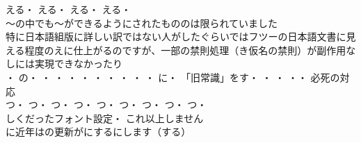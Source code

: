 える・
える・
える・
える・
\\
〜の中でも〜ができるようにされたもののは限られていました\\
特に日本語組版に詳しい訳ではない人がしたぐらいではフツーの日本語文書に見える程度のえに仕上がるのですが、一部の禁則処理（き仮名の禁則）が副作用なしには実現できなかったり\\

・
の・
・
・
・
・
・
・
・
・
・
に・
「旧常識」をす・
・
・
・・
必死の対応\\
つ・
つ・
つ・
つ・
つ・
つ・
つ・
つ・
つ・
\\

しくだったフォント設定・
これ以上しません\\
に近年は\santen{}の更新がに\santen{}するにします（する）\\
